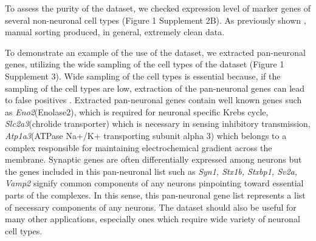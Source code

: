 To assess the purity of the dataset, we checked expression level of marker genes of several non-neuronal cell types (Figure 1 Supplement 2B). As previously shown \citep{Okaty_2011}, manual sorting produced, in general, extremely clean data.

 To demonstrate an example of the use of the dataset, we extracted pan-neuronal genes, utilizing the wide sampling of the cell types of the dataset (Figure 1 Supplement 3). Wide sampling of the cell types is essential because, if the sampling of the cell types are low, extraction of the pan-neuronal genes can lead to false positives \citep{Zhang_2014,Mo_2015,Stefanakis_2015}. Extracted pan-neuronal genes contain well known genes such as \textit{Eno2}(Enolase2), which is required for neuronal specific Krebs cycle, \textit{Slc2a3}(chrolide transporter) which is necessary in sensing inhibitory transmission, \textit{Atp1a3}(ATPase Na+/K+ transporting subunit alpha 3) which belongs to a complex responsible for maintaining electrochemical gradient across the membrane. Synaptic genes are often differentially expressed among neurons but the genes included in this pan-neuronal list such as \textit{Syn1, Stx1b, Stxbp1, Sv2a, Vamp2} signify common components of any neurons pinpointing toward essential parts of the complexes. In this sense, this pan-neuronal gene list represents a list of necessary components of any neurons. The dataset should also be useful for many other applications, especially ones which require wide variety of neuronal cell types. 

